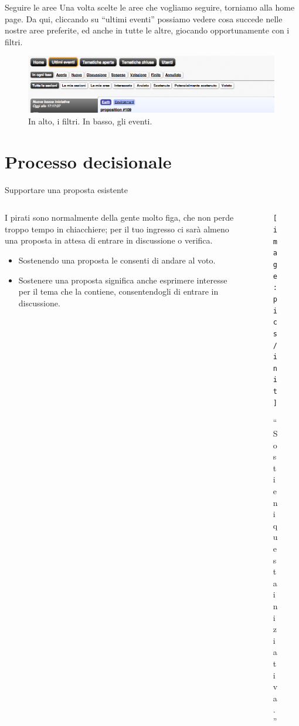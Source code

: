 \begin{frame}{Seguire le aree}
Una volta scelte le aree che vogliamo seguire, torniamo alla home page. Da qui, cliccando su ``ultimi eventi'' possiamo vedere cosa succede nelle nostre aree preferite, ed anche in tutte le altre, giocando opportunamente con i filtri.
\begin{figure}
\centering\includegraphics[width=0.99\textwidth]{pics/timeline-filters}
\caption{In alto, i filtri. In basso, gli eventi.}
\end{figure}
\end{frame}

\section{Processo decisionale}
\begin{frame}{Supportare una proposta esistente}
\begin{columns}
\begin{column}{.5\textwidth}
I pirati sono normalmente della gente molto figa, che non perde troppo tempo in chiacchiere; per il tuo ingresso ci sarà almeno una proposta in attesa di entrare in discussione o verifica.
\begin{itemize}
\item Sostenendo una proposta le consenti di andare al voto.
\item Sostenere una proposta significa anche esprimere interesse per il tema che la contiene, consentendogli di entrare in discussione.
\end{itemize}
\end{column}
\begin{column}{.5\textwidth}\begin{figure}\centering\texttt{[image: pics/init]}
\caption{``Sostieni questa iniziativa.''}
\end{figure}\end{column}
\end{columns}
\end{frame}

